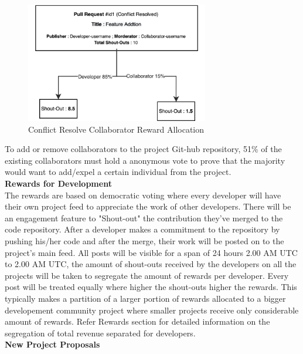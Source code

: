 \documentclass[conference]{IEEEtran}
\begin{document}
\begin{figure}[H]
\begin{center}
\includegraphics[width=8cm]{dev-reward-distribution}
\caption{Conflict Resolve Collaborator Reward Allocation}
\end{center}
\end{figure}

To add or remove collaborators to the project Git-hub repository, 51\% of the existing collaborators must hold a anonymous vote to prove that the majority would want to add/expel a certain individual from the project.\\
 
\textbf{Rewards for Development}\\

The rewards are based on democratic voting where every developer will have their own project feed to appreciate the work of other developers. There will be an engagement feature to "Shout-out" the contribution they've merged to the code repository. After a developer makes a commitment to the repository by pushing his/her code and after the merge, their work will be posted on to the project's main feed. All posts will be visible for a span of 24 hours 2.00 AM UTC to 2.00 AM UTC, the amount of shout-outs received by the developers on all the projects will be taken to segregate the amount of rewards per developer. Every post will be treated equally where higher the shout-outs higher the rewards. This typically makes a partition of a larger portion of rewards allocated to a bigger developement community project where smaller projects receive only considerable amount of rewards. Refer Rewards section for detailed information on the segregation of total revenue separated for developers.\\


\textbf{New Project Proposals}\\
\end{document}

